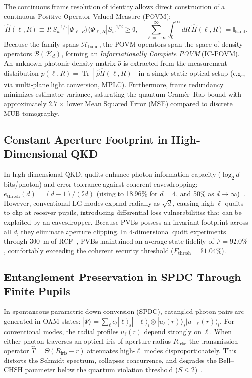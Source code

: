 \documentclass{optica-article}
\begin{document}
The continuous frame resolution of identity allows direct construction of a continuous Positive Operator-Valued Measure (POVM):
\begin{equation}
\boxed{\hat{\Pi}(\ell, R) \equiv R \, S_w^{-1/2} |\Phi_{\ell, R}\rangle \langle \Phi_{\ell, R}| S_w^{-1/2} \ge 0, \quad \sum_{\ell=-\infty}^\infty \int_0^\infty dR \, \hat{\Pi}(\ell, R) = \mathbb{I}_{\text{band}}.}
\label{eq:povm_def}
\end{equation}
Because the family spans $\mathcal{H}_{\text{band}}$, the POVM operators span the space of density operators $\mathcal{B}(\mathcal{H}_d)$, forming an \emph{Informationally Complete POVM} (IC-POVM). An unknown photonic density matrix $\hat{\rho}$ is extracted from the measurement distribution $p(\ell, R) = \operatorname{Tr}[\hat{\rho} \hat{\Pi}(\ell, R)]$ in a single static optical setup (e.g., via multi-plane light conversion, MPLC). Furthermore, frame redundancy minimizes estimator variance, saturating the quantum Cram{\'e}r--Rao bound with approximately $2.7\times$ lower Mean Squared Error (MSE) compared to discrete MUB tomography.

\subsection{Constant Aperture Footprint in High-Dimensional QKD}

In high-dimensional QKD, qudits enhance photon information capacity ($\log_2 d$ bits/photon) and error tolerance against coherent eavesdropping: $e_{\text{thresh}}(d) = (d-1)/(2d)$ (rising to 18.96\% for $d=4$, and 50\% as $d \to \infty$)~\cite{Cerf2002}. However, conventional LG modes expand radially as $\sqrt{d}$, causing high-$\ell$ qudits to clip at receiver pupils, introducing differential loss vulnerabilities that can be exploited by an eavesdropper. Because PVBs possess an invariant footprint across all $d$, they eliminate aperture clipping. In 4-dimensional qudit experiments through 300~m of RCF~\cite{Villalba2023}, PVBs maintained an average state fidelity of $F = 92.0\%$, comfortably exceeding the coherent security threshold ($F_{\text{thresh}} = 81.04\%$).

\subsection{Entanglement Preservation in SPDC Through Finite Pupils}

In spontaneous parametric down-conversion (SPDC), entangled photon pairs are generated in OAM states: $|\Psi\rangle = \sum_\ell c_\ell |\ell\rangle_s |-\ell\rangle_i \otimes |u_\ell(r)\rangle_s |u_{-\ell}(r)\rangle_i$. For conventional modes, the radial profiles $u_\ell(r)$ depend strongly on $\ell$. When either photon traverses an optical iris of aperture radius $R_{\text{iris}}$, the transmission operator $\hat{T} = \Theta(R_{\text{iris}} - r)$ attenuates high-$\ell$ modes disproportionately. This distorts the Schmidt spectrum, collapses concurrence, and degrades the Bell--CHSH parameter below the quantum violation threshold ($S \le 2$)~\cite{Clauser1969}.
\end{document}
